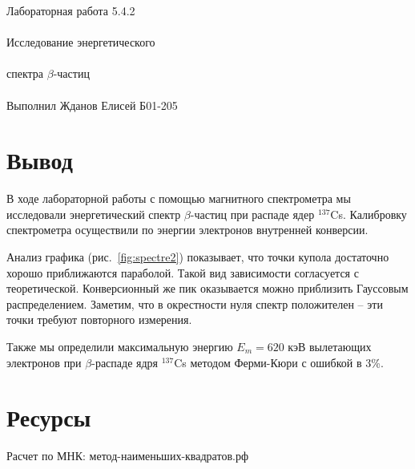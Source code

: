 \documentclass{astroedu-lab}
\begin{document}
\begin{problem}{\huge Лабораторная работа 5.4.2\\\\Исследование энергетического\\\\спектра $\beta$-частиц\\\\Выполнил Жданов Елисей Б01-205}

\section{Вывод}

В ходе лабораторной работы с помощью магнитного спектрометра мы исследовали энергетический спектр $\beta$-частиц при распаде ядер $^{137}$Cs. Калибровку спектрометра осуществили по энергии электронов внутренней конверсии.
	
	Анализ графика (рис.~\ref{fig:spectre2}) показывает, что точки купола достаточно хорошо приближаются параболой. Такой вид зависимости согласуется с теоретической. Конверсионный же пик оказывается можно приблизить Гауссовым распределением. Заметим, что в окрестности нуля спектр положителен -- эти точки требуют повторного измерения.
	
	Также мы определили максимальную энергию $E_m = 620$ кэВ вылетающих электронов при $\beta$-распаде ядря $^{137}$Cs методом Ферми-Кюри  с ошибкой в 3\%.


\section{Ресурсы}

Расчет по МНК: метод-наименьших-квадратов.рф


\end{problem}
\end{document}
